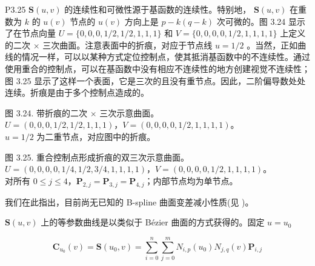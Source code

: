 \documentclass[../main.tex]{subfiles}
\begin{document}
P3.25 \(\mathbf{S}\left( {u,v}\right)\) 的连续性和可微性源于基函数的连续性。特别地， \(\mathbf{S}\left( {u,v}\right)\) 在重数为 \(k\) 的 \(u\left( v\right)\) 节点的 \(u\left( v\right)\) 方向上是 \(p - k\left( {q - k}\right)\) 次可微的。图 3.24 显示了在节点向量 \(U = \{ 0,0,0,1/2,1/2,1,1,1\}\) 和 \(V = \{ 0,0,0,0,1/2,1,1,1,1\}\) 上定义的二次 \(\times\) 三次曲面。注意表面中的折痕，对应于节点线 \(u = 1/2\) 。当然，正如曲线的情况一样，可以以某种方式定位控制点，使其抵消基函数中的不连续性。通过使用重合的控制点，可以在基函数中没有相应不连续性的地方创建视觉不连续性；图 3.25 显示了这样一个表面，它是三次的且没有重节点。因此，二阶偏导数处处连续。折痕是由于多个控制点造成的。

\begin{center}
\begin{minipage}{18cm}
\vspace*{.6\baselineskip}
\centering
{}
\par\smallskip
图 3.24. 带折痕的二次 \(\times\) 三次示意曲面。\\ \(U=(0,0,0,1/2,1/2,1,1,1)\)，\(V=(0,0,0,0,1/2,1,1,1,1)\)。\\ \(u=1/2\) 为二重节点，对应图中的折痕。
\end{minipage}
\end{center}

\begin{center}
\begin{minipage}{18cm}
\vspace*{.6\baselineskip}
\centering
{}
\par\smallskip
图 3.25. 重合控制点形成折痕的双三次示意曲面。\\ \(U=(0,0,0,0,1/4,1/2,3/4,1,1,1,1)\)，\(V=(0,0,0,0,1/2,1,1,1,1)\)。\\ 对所有 \(0\leq j\leq4\)，\(\mathbf P_{2,j}=\mathbf P_{3,j}=\mathbf P_{4,j}\)；内部节点均为单节点。
\end{minipage}
\end{center}

我们在此指出，目前尚无已知的 B-spline 曲面变差减小性质(见 \cite{Prau92})。

\(\mathbf{S}\left( {u,v}\right)\) 上的等参数曲线是以类似于 Bézier 曲面的方式获得的。固定 \(u = {u}_{0}\)

\[
{\mathbf{C}}_{{u}_{0}}\left( v\right)  = \mathbf{S}\left( {{u}_{0},v}\right)  = \mathop{\sum }\limits_{{i = 0}}^{n}\mathop{\sum }\limits_{{j = 0}}^{m}{N}_{i,p}\left( {u}_{0}\right) {N}_{j,q}\left( v\right) {\mathbf{P}}_{i,j}
\]
\end{document}
